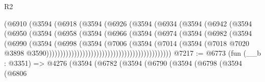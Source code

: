 \begin{lexlean}{R2}
\begin{coremodule}
                                    (@6910
                                      (@3594
                                        (@6918
                                          (@3594
                                            (@6926
                                              (@3594
                                                (@6934
                                                  (@3594
                                                    (@6942
                                                      (@3594
                                                        (@6950
                                                          (@3594
                                                            (@6958
                                                              (@3594
                                                                (@6966
                                                                  (@3594
                                                                    (@6974
                                                                      (@3594
                                                                        (@6982
                                                                          (@3594
                                                                            (@6990
                                                                              (@3594
                                                                                (@6998
                                                                                  (@3594
                                                                                    (@7006
                                                                                      (@3594
                                                                                        (@7014
                                                                                          (@3594
                                                                                            (@7018
                                                                                              @7020
                                                                                              @3898
                                                                                              @3590)))))))))))))))))))))))))))))))))))))))))))))
@7217 := @6773
    (fun (__b : @3351) =>
    @4276
      (@3594
        (@6782
          (@3594
            (@6790
              (@3594
                (@6798
                  (@3594
                    (@6806

\end{coremodule}
\end{lexlean}

